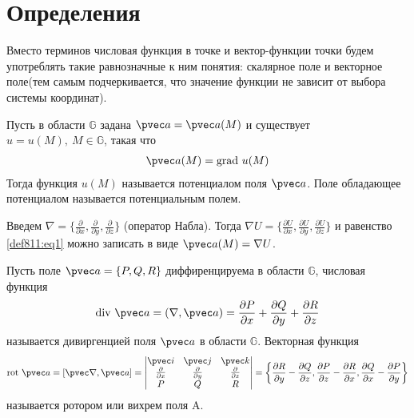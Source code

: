 \section{Определения}
Вместо терминов числовая функция в точке и вектор-функции точки будем
употреблять такие равнозначные к ним понятия: скалярное поле и векторное
поле(тем самым подчеркивается, что значение функции не зависит от выбора
системы координат).

\begin{definition}
  Пусть в области $\mathbb{G}$ задана $\pvec a = \pvec a(M)$ и существует $u =
  u(M), \ M \in \mathbb{G}$, такая что
  \begin{gather}
    \pvec a(M) = \mbox{grad} \ u(M)
    \label{def811:eq1}
  \end{gather}
  Тогда функция $u(M)$ называется потенциалом поля $\pvec a$. Поле обладающее
  потенциалом называется потенциальным полем.
\end{definition}

Введем $\nabla = \{\frac{\partial}{\partial x}, \frac{\partial}{\partial y},
\frac{\partial}{\partial z}\}$ (оператор Набла). Тогда $\nabla U =
\{\frac{\partial U}{\partial x}, \frac{\partial U}{\partial y},
\frac{\partial U}{\partial z}\}$ и равенство \eqref{def811:eq1} можно записать
в виде $\pvec a(M) = \nabla U$.

\begin{definition}
  Пусть поле $\pvec a = \{P, Q, R\}$ диффиренцируема в области $\mathbb{G}$,
  числовая функция
  \begin{gather*}
    \mbox{div} \ \pvec a = (\nabla, \pvec a) = \frac{\partial P}{\partial x} +
    \frac{\partial Q}{\partial y} + \frac{\partial R}{\partial z}
  \end{gather*}
  называется дивиргенцией поля $\pvec a$ в области $\mathbb{G}$.
  Векторная функция
  \begin{gather*}
    \mbox{rot} \ \pvec a = [\pvec \nabla, \pvec a] =
    \begin{vmatrix}
      \pvec i & \pvec j & \pvec k \\
      \frac{\partial }{\partial x} & \frac{\partial }{\partial y} &
      \frac{\partial }{\partial z} \\
      P & Q & R
    \end{vmatrix} =
    \left\{\frac{\partial R}{\partial y} - \frac{\partial Q}{\partial z},
    \frac{\partial P}{\partial z} - \frac{\partial R}{\partial x},
    \frac{\partial Q}{\partial x} - \frac{\partial P}{\partial y}\right\}
  \end{gather*}
  называется ротором или вихрем поля A.
\end{definition}

